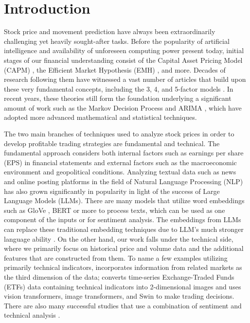\documentclass[preprint,12pt,numafflabel,authoryear]{elsarticle}
\begin{document}
\section{Introduction}
\label{sec:Introduction}

Stock price and movement prediction have always been extraordinarily challenging yet heavily sought-after tasks. Before the popularity of artificial intelligence and availability of unforeseen computing power present today, initial stages of our financial understanding consist of the Capital Asset Pricing Model (CAPM) \citep{sharpe1964capital}, the Efficient Market Hypothesis (EMH) \citep{fama1970efficient}, and more. Decades of research following them have witnessed a vast number of articles that build upon these very fundamental concepts, including the 3, 4, and 5-factor models \citep{fama1993common, carhart1997persistence, fama2015five}. In recent years, these theories still form the foundation underlying a significant amount of work such as the Markov Decision Process \citep{park2024novel} and ARIMA \citep{box2015time}, which have adopted more advanced mathematical and statistical techniques.

The two main branches of techniques used to analyze stock prices in order to develop profitable trading strategies are fundamental and technical. The fundamental approach considers both internal factors such as earnings per share (EPS) in financial statements and external factors such as the macroeconomic environment and geopolitical conditions. Analyzing textual data such as news and online posting platforms in the field of Natural Language Processing (NLP) has also grown significantly in popularity in light of the success of Large Language Models (LLMs). There are many models that utilize word embeddings such as GloVe \citep{pennington2014glove, zhang2022transformer}, BERT \citep{devlin2018bert} or more \citep{lin2022factors} to process texts, which can be used as one component of the inputs or for sentiment analysis. The embeddings from LLMs can replace these traditional embedding techniques due to LLM's much stronger language ability \citep{kim2024profitability}. On the other hand, our work falls under the technical side, where we primarily focus on historical price and volume data and the additional features that are constructed from them. To name a few examples utilizing primarily technical indicators, \citet{Hoseinzade2019CNNpred} incorporates information from related markets as the third dimension of the data; \citet{gezici2024deep} converts time-series Exchange-Traded Funds (ETFs) data containing technical indicators into 2-dimensional images and uses vision transformers, image transformers, and Swin to make trading decisions. There are also many successful studies that use a combination of sentiment and technical analysis \citep{picasso2019technical, prachyachuwong2021stock}.
\end{document}
